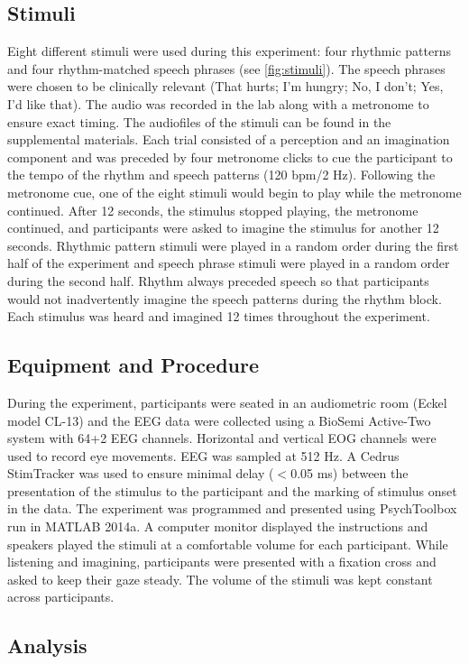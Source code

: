 \documentclass[utf8]{frontiersSCNS} %
\begin{document}
\subsection{Stimuli}
Eight different stimuli were used during this experiment: four rhythmic patterns and four rhythm-matched speech phrases (see \autoref{fig:stimuli}). 
The speech phrases were chosen to be clinically relevant (That hurts; I'm hungry; No, I don't; Yes, I'd like that).
The audio was recorded in the lab along with a metronome to ensure exact timing.
The audiofiles of the stimuli can be found in the supplemental materials. 
Each trial consisted of a perception and an imagination component and was preceded by four metronome clicks to cue the participant to the tempo of the rhythm and speech patterns (120 bpm/2 Hz). 
Following the metronome cue, one of the eight stimuli would begin to play while the metronome continued.
After 12 seconds, the stimulus stopped playing, the metronome continued, and participants were asked to imagine the stimulus for another 12 seconds. 
Rhythmic pattern stimuli were played in a random order during the first half of the experiment and speech phrase stimuli were played in a random order during the second half. 
Rhythm always preceded speech so that participants would not inadvertently imagine the speech patterns during the rhythm block.
Each stimulus was heard and imagined 12 times throughout the experiment.
\subsection{Equipment and Procedure}
During the experiment, participants were seated in an audiometric room (Eckel model CL-13) and the \ac{EEG} data were collected using a BioSemi Active-Two system with 64+2 EEG channels. 
Horizontal and vertical EOG channels were used to record eye movements. \ac{EEG} was sampled at 512 Hz. 
A Cedrus StimTracker was used to ensure minimal delay ($<$0.05 ms) between the presentation of the stimulus to the participant and the marking of stimulus onset in the data. 
The experiment was programmed and presented using PsychToolbox run in MATLAB 2014a. A computer monitor displayed the instructions and speakers played the stimuli at a comfortable volume for each participant. 
While listening and imagining, participants were presented with a fixation cross and asked to keep their gaze steady.
The volume of the stimuli was kept constant across participants.
\subsection{Analysis}
\end{document}
